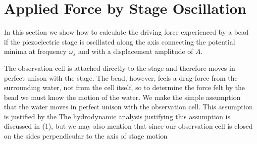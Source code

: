 \section{Applied Force by Stage Oscillation}

In this section we show how to calculate the driving force experienced by a bead if the piezoelectric stage is oscillated along the axis connecting the potential minima at frequency $\omega_s$ and with a displacement amplitude of $A$.

The observation cell is attached directly to the stage and therefore moves in perfect unison with the stage. The bead, however, feels a drag force from the surrounding water, not from the cell itself, so to determine the force felt by the bead we must know the motion of the water. We make the simple assumption that the water moves in perfect unison with the observation cell. This assumption is justified by the  The hydrodynamic analysis justifying this assumption is discussed in (1), but we may also mention that since our observation cell is closed on the sides perpendicular to the axis of stage motion

